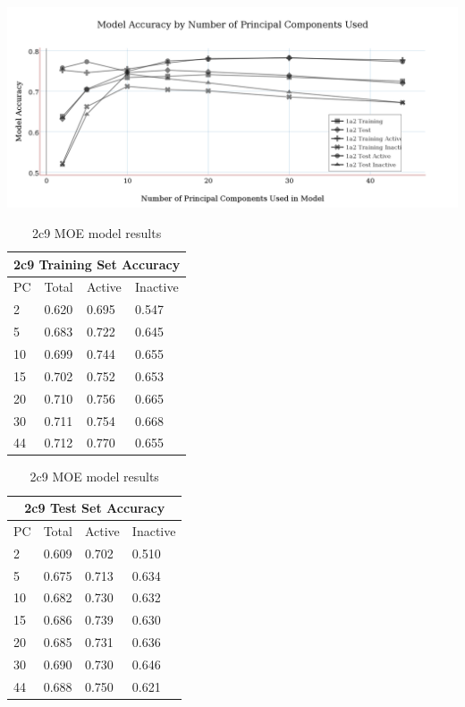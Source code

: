 \includegraphics[width=1\textwidth]{../img/1a2_moe_model_accuracy.png}

\begin{table}[h]
\begin{minipage}{.5\linewidth}
\centering
\begin{tabular}{|l|l|l|l|}
\hline
\multicolumn{4}{|c|}{2c9 Training Set Accuracy} \\ \hline
PC & Total          & Active          & Inactive\\ \hline
2  & 0.620          & 0.695           & 0.547   \\ \hline
5  & 0.683          & 0.722           & 0.645   \\ \hline
10 & 0.699          & 0.744           & 0.655   \\ \hline
15 & 0.702          & 0.752           & 0.653   \\ \hline
20 & 0.710          & 0.756           & 0.665   \\ \hline
30 & 0.711          & 0.754           & 0.668   \\ \hline
44 & 0.712          & 0.770           & 0.655   \\ \hline
\end{tabular}
\end{minipage}
\begin{minipage}{.5\linewidth}
\centering
\begin{tabular}{|l|l|l|l|}
\hline
\multicolumn{4}{|c|}{2c9 Test Set Accuracy}     \\ \hline
PC & Total          & Active          & Inactive\\ \hline
2  & 0.609          & 0.702           & 0.510   \\ \hline
5  & 0.675          & 0.713           & 0.634   \\ \hline
10 & 0.682          & 0.730           & 0.632   \\ \hline
15 & 0.686          & 0.739           & 0.630   \\ \hline
20 & 0.685          & 0.731           & 0.636   \\ \hline
30 & 0.690          & 0.730           & 0.646   \\ \hline
44 & 0.688          & 0.750           & 0.621   \\ \hline
\end{tabular}
\end{minipage}
\caption{2c9 MOE model results}
\end{table}

